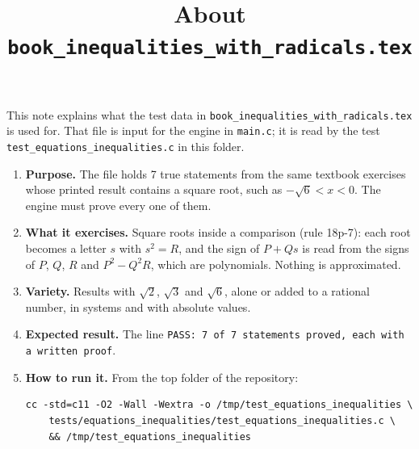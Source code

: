 \documentclass[11pt,a4paper]{article}
\title{About \texttt{book\_inequalities\_with\_radicals.tex}}
\author{}
\date{}
\begin{document}
\maketitle
This note explains what the test data in \texttt{book\_inequalities\_with\_radicals.tex} is used for. That file is input for the engine in \texttt{main.c}; it is read by the test \texttt{test\_equations\_inequalities.c} in this folder.

\begin{enumerate}
\item \textbf{Purpose.} The file holds 7 true statements from the same textbook exercises whose printed result contains a square root, such as $-\sqrt{6} < x < 0$. The engine must prove every one of them.

\item \textbf{What it exercises.} Square roots inside a comparison (rule 18p-7): each root becomes a letter $s$ with $s^{2} = R$, and the sign of $P + Q s$ is read from the signs of $P$, $Q$, $R$ and $P^{2} - Q^{2} R$, which are polynomials. Nothing is approximated.

\item \textbf{Variety.} Results with $\sqrt{2}$, $\sqrt{3}$ and $\sqrt{6}$, alone or added to a rational number, in systems and with absolute values.

\item \textbf{Expected result.} The line \texttt{PASS: 7 of 7 statements proved, each with a written proof}.

\item \textbf{How to run it.} From the top folder of the repository:
\begin{verbatim}
cc -std=c11 -O2 -Wall -Wextra -o /tmp/test_equations_inequalities \
    tests/equations_inequalities/test_equations_inequalities.c \
    && /tmp/test_equations_inequalities
\end{verbatim}
\end{enumerate}
\end{document}
